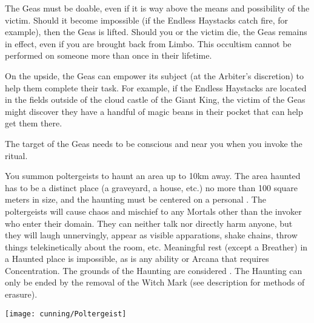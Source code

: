The Geas must be doable, even if it is way above the means and possibility of the victim.  Should it become impossible (if the Endless Haystacks catch fire, for example), then the Geas is lifted.  Should you or the victim die, the Geas remains in effect, even if you are brought back from Limbo. This occultism cannot be performed on someone more than once in their lifetime.

On the upside, the Geas can empower its subject (at the Arbiter's discretion) to help them complete their task.  For example, if the Endless Haystacks are located in the fields outside of the cloud castle of the Giant King, the victim of the Geas might discover they have a handful of magic beans in their pocket that can help get them there.

The target of the Geas needs to be conscious and near you when you invoke the ritual.


\OCCULT[
  Name=Haunt,
  Link=occultism-haunt,
  Pips=5,
  Time=Days
]

You summon poltergeists to haunt an area up to 10km away. The area haunted has to be a distinct place (a graveyard, a house, etc.) no more than 100 square meters in size, and the haunting must be centered on a personal . The poltergeists will cause chaos and mischief to any Mortals other than the invoker who enter their domain. They can neither talk nor directly harm anyone, but they will laugh unnervingly, appear as visible apparations, shake chains, throw things telekinetically about the room, etc. Meaningful rest (except a Breather) in a Haunted place is impossible, as is any ability or Arcana that requires Concentration. The grounds of the Haunting are considered . The Haunting can only be ended by the removal of the Witch Mark (see description for methods of erasure).

\begin{center}
\texttt{[image: cunning/Poltergeist]}
\end{center} 

\cbreak


\OCCULT[
  Name=Hekaphage,
  Link=occultism-hekaphage,
  Pips=1+,
  Time=Days
]




